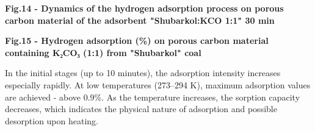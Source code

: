 

{\bfseries Fig.14 - Dynamics of the hydrogen adsorption process on porous
carbon material of the adsorbent
"Shubarkol:KCO 1:1" 30 min}


{\bfseries Fig.15 - Hydrogen adsorption (\%) on porous carbon material
containing K₂CO₃ (1:1) from "Shubarkol" coal}

In the initial stages (up to 10 minutes), the adsorption intensity
increases especially rapidly. At low temperatures (273--294 K), maximum
adsorption values \hspace{0pt}\hspace{0pt}are achieved - above 0.9\%. As
the temperature increases, the sorption capacity decreases, which
indicates the physical nature of adsorption and possible desorption upon
heating.

